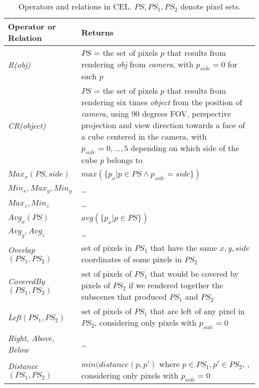 \begin{table}
\begin{tabular}{|p{3.3cm}|p{8.7cm}|}\hline
    Operator or Relation
& 	 Returns \\
\hline
    \emph{R(obj)}
& 	 $PS$ = the set of pixels $p$ that results from rendering \emph{obj} from \emph{camera}, with $p_{side}=0$
for each $p$\\ \hline
   
 	 \emph{CR(object)}
& 	 $PS$ = the set of pixels $p$ that results from rendering six times \emph{object} from the position of \emph{camera}, using 90 degrees FOV,
      perspective projection and view direction towards a face of a cube centered in the camera, with $p_{side}=0, \dots, 5$ depending
on which side of the cube $p$ belongs to\\ \hline
	
	
	$Max_x(PS,side)$ 			&	$max( \{p_x | p \in PS \wedge p_{side}=side \} )$ \\ 
	$Min_x, Max_y, Min_y$ & \dots \\
	$Max_z, Min_z$ & \dots \\ \hline
	
	$Avg_x(PS)$				&	$avg( \{p_x | p \in PS \} )$ \\ 
	$Avg_y, Avg_z$	& \dots \\ \hline
	
	\emph{Overlap}$(PS_1, PS_2)$		&  set of pixels in $PS_1$ that have the same $x, y, side$ coordinates of some pixels in $PS_2$ \\ \hline
	
	\emph{CoveredBy}$(PS_1, PS_2)$	&  set of pixels of $PS_1$ that would be covered by pixels of $PS_2$ if we rendered together the subscenes that produced $PS_1$ and $PS_2$ \\ \hline
	
	\emph{Left}$(PS_1, PS_2)$ &  	set of pixels of $PS_1$ that are left of any pixel in $PS_2$, considering only pixels with $p_{side}=0$ \\ 
	\emph{Right, Above, Below} & \dots \\ \hline
	\emph{Distance}$(PS_1, PS_2)$ & $min( distance(p,p')$ where $p \in PS_1, p' \in PS_2$, , considering only pixels with $p_{side}=0$ \\ \hline
	
\end{tabular}
\caption{Operators and relations in CEL. $PS, PS_1, PS_2$ denote pixel sets.} \label{Table:CameraLanguage}
\end{table}
	
